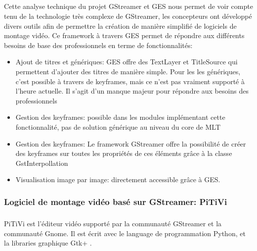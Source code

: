 \subparagraph{ }

Cette analyse technique du projet GStreamer et GES nous permet de voir
compte tenu de la technologie très complexe de GStreamer, les concepteurs
ont développé divers outils afin de permettre la création de manière
simplifié de logiciels de montage vidéo. Ce framework à travers GES
permet de répondre aux différents besoins de base des professionnels
en terme de fonctionnalités:

\begin{itemize}

  \item {Ajout de titres et génériques: GES offre des TextLayer
  et TitleSource qui permettent d'ajouter des titres de manière
  simple. Pour les
    les génériques, c'est possible à travers de keyframes, mais ce
    n'est pas vraiment supporté à l'heure actuelle. Il s'agit d'un
    manque majeur pour répondre aux besoins des professionnels}

  \item {Gestion des keyframes: possible dans les modules implémentant
    cette fonctionnalité, pas de solution générique au niveau du core
    de MLT}

  \item {Gestion des keyframes: Le framework GStreamer offre la
  possibilité
    de créer des keyframes sur toutes les propriétés de ces éléments
    grâce à la classe GstInterpollation}

  \item {Visualisation image par image: directement accessible grâce
  à GES.}

\end{itemize}

\subsubsection {Logiciel de montage vidéo basé sur GStreamer: PiTiVi}

\subparagraph{}

PiTiVi est l'éditeur vidéo supporté par la communauté GStreamer et la
communauté Gnome. Il est écrit avec le language de programmation Python,
et la libraries graphique Gtk+ .

